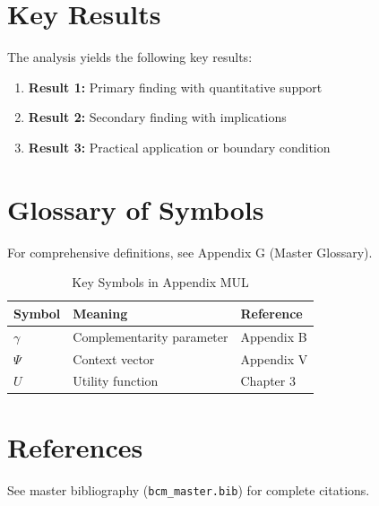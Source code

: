 \section{Key Results}
\label{sec:mul-results}

The analysis yields the following key results:

\begin{enumerate}
    \item \textbf{Result 1:} Primary finding with quantitative support
    \item \textbf{Result 2:} Secondary finding with implications
    \item \textbf{Result 3:} Practical application or boundary condition
\end{enumerate}

\section{Glossary of Symbols}
\label{sec:mul-glossary}

For comprehensive definitions, see Appendix G (Master Glossary).

\begin{table}[htbp]
\centering
\caption{Key Symbols in Appendix MUL}
\begin{tabular}{lll}
\toprule
\textbf{Symbol} & \textbf{Meaning} & \textbf{Reference} \\
\midrule
$\gamma$ & Complementarity parameter & Appendix B \\
$\Psi$ & Context vector & Appendix V \\
$U$ & Utility function & Chapter 3 \\
\bottomrule
\end{tabular}
\end{table}


\section{References}
\label{sec:mul-references}

See master bibliography (\texttt{bcm\_master.bib}) for complete citations.

\nocite{bcm_master}

